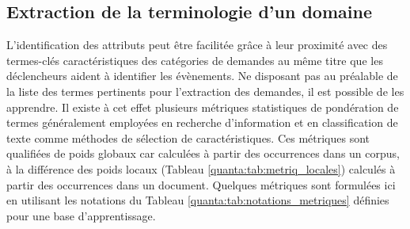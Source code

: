\subsection{Extraction de la terminologie d'un domaine}
L'identification des attributs peut être facilitée grâce à leur proximité avec des termes-clés caractéristiques des catégories de demandes au même titre que les \og déclencheurs \fg{} aident à identifier les évènements.
Ne disposant pas au préalable de la liste des termes pertinents pour l'extraction des demandes, il est possible de les apprendre. Il existe à cet effet plusieurs métriques statistiques de pondération de termes généralement employées en recherche d'information et en classification de texte comme méthodes de sélection de caractéristiques. Ces métriques sont qualifiées de poids globaux car calculées à partir des occurrences dans un corpus, à la différence des poids locaux (Tableau \ref{quanta:tab:metriq_locales}) calculés à partir des occurrences dans un document. Quelques métriques sont formulées ici en utilisant les notations du Tableau \ref{quanta:tab:notations_metriques} définies pour une base d'apprentissage.


